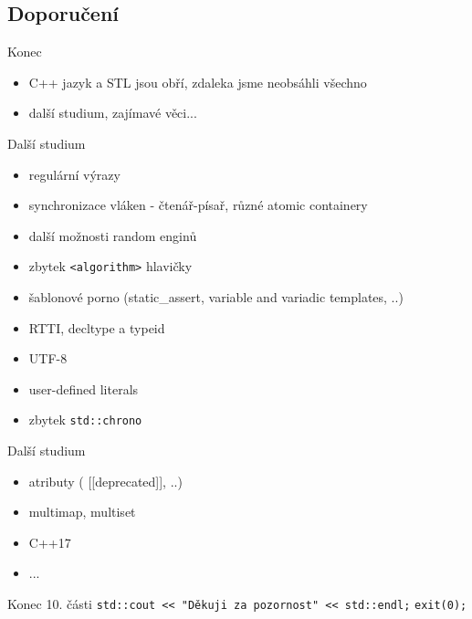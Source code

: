 \documentclass{beamer}
\begin{document}
\subsection{Doporučení}

\begin{xframe}{Konec}
	\begin{itemize}
		\item C++ jazyk a STL jsou obří, zdaleka jsme neobsáhli všechno
		\item další studium, zajímavé věci...
	\end{itemize}
\end{xframe}

\begin{xframe}{Další studium}
	\begin{itemize}
		\item regulární výrazy
		\item synchronizace vláken - čtenář-písař, různé atomic containery
		\item další možnosti random enginů
		\item zbytek \texttt{<algorithm>} hlavičky
		\item šablonové porno (static\_assert, variable and variadic templates, ..)
		\item RTTI, decltype a typeid
		\item UTF-8
		\item user-defined literals
		\item zbytek \texttt{std::chrono}
	\end{itemize}
\end{xframe}

\begin{xframe}{Další studium}
	\begin{itemize}
		\item atributy ( [[deprecated]], ..)
		\item multimap, multiset
		\item C++17
		\item ...
	\end{itemize}
\end{xframe}





\begin{xframe}{Konec 10. části}
\texttt{std::cout << "Děkuji za pozornost"~<< std::endl;}
\texttt{exit(0);}
\end{xframe}
\end{document}
